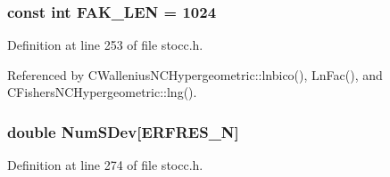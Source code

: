 \subsubsection[{F\-A\-K\-\_\-\-L\-E\-N}]{\setlength{\rightskip}{0pt plus 5cm}const int F\-A\-K\-\_\-\-L\-E\-N = 1024\hspace{0.3cm}{\ttfamily [static]}}\label{rnd_2stocc_8h_a6e8359e381f35500bd0278dbd2a79554}


Definition at line 253 of file stocc.\-h.



Referenced by C\-Wallenius\-N\-C\-Hypergeometric\-::lnbico(), Ln\-Fac(), and C\-Fishers\-N\-C\-Hypergeometric\-::lng().

\subsubsection[{Num\-S\-Dev}]{\setlength{\rightskip}{0pt plus 5cm}double Num\-S\-Dev[{\bf E\-R\-F\-R\-E\-S\-\_\-\-N}]}\label{rnd_2stocc_8h_a29461f93b72e58f78d8347360167bb79}


Definition at line 274 of file stocc.\-h.

